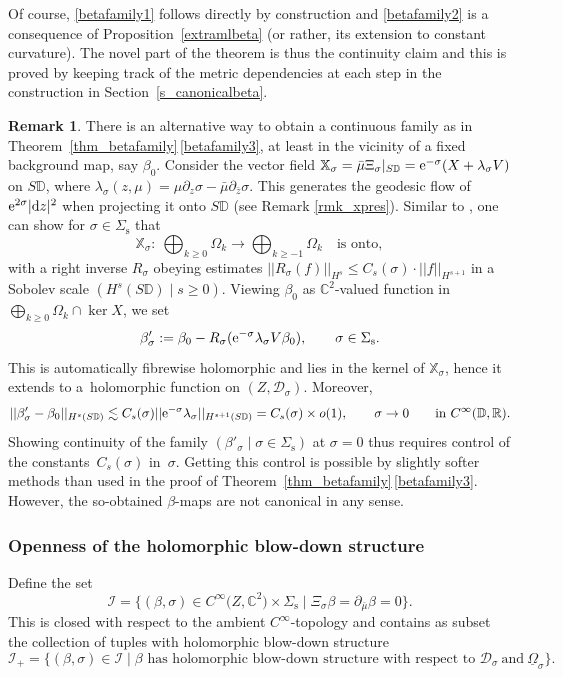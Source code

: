 \documentclass[pdftex]{sigma}
\numberwithin{equation}{section}
\theoremstyle{definition}
\newtheorem{Remark}[Theorem]{Remark}
\newcommand{\R}{\mathbb{R}} %
\newcommand{\C}{\mathbb{C}} %
\newcommand{\DD}{\mathbb{D}} %
\newcommand{\1}{{\bf 1}}
\newcommand{\Om}{{\underline{\Omega}}}
\newcommand{\D}{\mathscr{D}}
\begin{document}
Of course, \ref{betafamily1} follows directly by construction and \ref{betafamily2} is a consequence of Proposition~\ref{extramlbeta} (or rather, its extension to constant curvature). The novel part of the theorem is thus the continuity claim and this is proved by keeping track of the metric dependencies at each step in the construction in Section~\ref{s_canonicalbeta}.


\begin{Remark}
There is an alternative way to obtain a continuous family as in Theorem~\ref{thm_betafamily}\,\ref{betafamily3}, at least in the vicinity of a fixed background map, say $\beta_0$. Consider the vector field $\mathbb X_\sigma = \bar \mu \Xi_\sigma|_{S\DD}={\rm e}^{-\sigma}(X+\lambda_\sigma V)$ on $S\DD$, where $\lambda_\sigma(z,\mu)=\mu \partial_z\sigma - \bar\mu\partial_{\bar z}\sigma$. This generates the geodesic flow of ${\rm e}^{2\sigma}|{\rm d}z|^2$ when projecting it onto $S\DD$ (see Remark \ref{rmk_xpres}). Similar to \cite[Proposition~3.1]{BoPa23}, one can show for $\sigma\in \Sigma_\mathrm{s}$ that
\[
	\mathbb X_\sigma\colon\ \bigoplus_{k\ge 0}\Omega_k\rightarrow \bigoplus_{k\ge -1}\Omega_k\quad \text{is onto},
\]	
with a right inverse $R_\sigma$ obeying estimates $||R_\sigma(f)||_{H^{s}} \le C_s(\sigma)\cdot || f||_{H^{s+1}}$ in a Sobolev scale $(H^s(S\DD)\mid s\ge 0)$. Viewing $\beta_0$ as $\C^2$-valued function in $\bigoplus_{k\ge 0}\Omega_k\cap \ker X$, we set
\[
	\beta'_\sigma : = \beta_0 - R_\sigma({\rm e}^{-\sigma}\lambda_\sigma V\beta_0),\qquad \sigma\in \Sigma_\mathrm{s}.
\]
This is automatically fibrewise holomorphic and lies in the kernel of $\mathbb X_\sigma$, hence it extends to a~holomorphic function on $(Z,\D_\sigma)$. Moreover,
\[
	||\beta_\sigma' - \beta_0 ||_{H^s(S\DD)} \lesssim C_s(\sigma) ||{\rm e}^{-\sigma}\lambda_\sigma||_{H^{s+1}(S\DD)} = C_s(\sigma) \times o(1),\qquad \sigma\rightarrow 0 \qquad \text{in}\  C^\infty(\DD,\R).
\]
Showing continuity of the family $(\beta'_\sigma\mid \sigma\in \Sigma_\mathrm{s})$ at $\sigma=0$ thus requires control of the constants~$C_s(\sigma)$ in~$\sigma$. Getting this control is possible by slightly softer methods than used in the proof of Theorem~\ref{thm_betafamily}\,\ref{betafamily3}. However, the so-obtained $\beta$-maps are not canonical in any sense.





\end{Remark}


\subsubsection{Openness of the holomorphic blow-down structure} \label{s_openness}
Define the set
\[
	\mathcal I = \big\{(\beta,\sigma)\in C^\infty\bigl(Z,\C^2\bigr) \times \Sigma_\mathrm{s} \mid \Xi_\sigma \beta = \partial_{\bar \mu} \beta =0 \big\}.
\]
This is closed with respect to the ambient $C^\infty$-topology and contains as subset the collection of tuples with holomorphic blow-down structure
\[
	\mathcal I_+=\{(\beta,\sigma)\in \mathcal I \mid \text{$\beta$ has holomorphic blow-down structure with respect to~} \D_\sigma~\text{and}~\Om_\sigma\}.
\]
\end{document}
